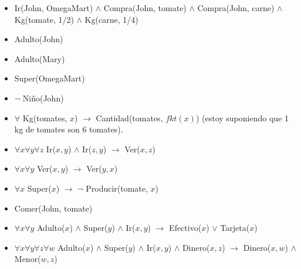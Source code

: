 \documentclass{article}
\begin{document}
\begin{itemize}
\item Ir(John, OmegaMart) $\land$ Compra(John, tomate) $\land$ Compra(John, carne) $\land$ Kg(tomate, 1/2) $\land$ Kg(carne, 1/4)
\item Adulto(John)
\item Adulto(Mary)
\item Super(OmegaMart)
\item $\lnot$ Niño(John)
\item $\forall$ Kg(tomates, $x$) $\rightarrow$ Cantidad(tomates, $fkt(x)$) (estoy suponiendo que 1 kg de tomates son 6 tomates).
\item $\forall x \forall y \forall z$ Ir($x, y$) $\land$ Ir($z, y$) $\rightarrow$ Ver($x, z$)
\item $\forall x \forall y$ Ver($x, y$) $\rightarrow$ Ver($y, x$)
\item $\forall x$ Super($x$) $\rightarrow$ $\lnot$ Producir(tomate, $x$)
\item Comer(John, tomate)
\item $\forall x \forall y$ Adulto($x$) $\land$ Super($y$) $\land$ Ir($x, y$) $\rightarrow$ Efectivo($x$) $\lor$ Tarjeta($x$)
\item $\forall x \forall y \forall z \forall w$ Adulto($x$) $\land$ Super($y$) $\land$ Ir($x, y$) $\land$ Dinero($x, z$) $\rightarrow$ Dinero($x, w$) $\land$ Menor($w, z$)
\end{itemize}
\end{document}
